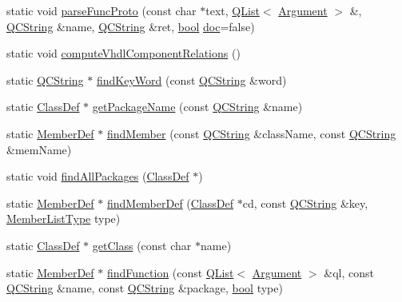 \begin{DoxyCompactItemize}
\item 
static void \hyperlink{class_vhdl_doc_gen_a42d423663159ccd360d8838005662343}{parse\+Func\+Proto} (const char $\ast$text, \hyperlink{class_q_list}{Q\+List}$<$ \hyperlink{struct_argument}{Argument} $>$ \&, \hyperlink{class_q_c_string}{Q\+C\+String} \&name, \hyperlink{class_q_c_string}{Q\+C\+String} \&ret, \hyperlink{qglobal_8h_a1062901a7428fdd9c7f180f5e01ea056}{bool} \hyperlink{vhdljjparser_8cpp_a9910424bf5401d657c3b3fdff6fcc152}{doc}=false)
\item 
static void \hyperlink{class_vhdl_doc_gen_ab8681769cd2f027fbf46a4836d3825e9}{compute\+Vhdl\+Component\+Relations} ()
\item 
static \hyperlink{class_q_c_string}{Q\+C\+String} $\ast$ \hyperlink{class_vhdl_doc_gen_a0338d8a473042e0ce824cd33def75544}{find\+Key\+Word} (const \hyperlink{class_q_c_string}{Q\+C\+String} \&word)
\item 
static \hyperlink{class_class_def}{Class\+Def} $\ast$ \hyperlink{class_vhdl_doc_gen_ad890048820909df255f6ee3f95d6ed80}{get\+Package\+Name} (const \hyperlink{class_q_c_string}{Q\+C\+String} \&name)
\item 
static \hyperlink{class_member_def}{Member\+Def} $\ast$ \hyperlink{class_vhdl_doc_gen_ac10fcedd625d329dc0013ee40e8546a7}{find\+Member} (const \hyperlink{class_q_c_string}{Q\+C\+String} \&class\+Name, const \hyperlink{class_q_c_string}{Q\+C\+String} \&mem\+Name)
\item 
static void \hyperlink{class_vhdl_doc_gen_a00216e37afbb1841a9631a80379b7f0a}{find\+All\+Packages} (\hyperlink{class_class_def}{Class\+Def} $\ast$)
\item 
static \hyperlink{class_member_def}{Member\+Def} $\ast$ \hyperlink{class_vhdl_doc_gen_a69d1010e9addd89076e51cb78ddf029f}{find\+Member\+Def} (\hyperlink{class_class_def}{Class\+Def} $\ast$cd, const \hyperlink{class_q_c_string}{Q\+C\+String} \&key, \hyperlink{types_8h_abe8ad5992f8938a28f918f51b199aa19}{Member\+List\+Type} type)
\item 
static \hyperlink{class_class_def}{Class\+Def} $\ast$ \hyperlink{class_vhdl_doc_gen_ac766b60a818a192ef5492bcee794a0ea}{get\+Class} (const char $\ast$name)
\item 
static \hyperlink{class_member_def}{Member\+Def} $\ast$ \hyperlink{class_vhdl_doc_gen_aded31b275385b372f3bb0d4182dd990e}{find\+Function} (const \hyperlink{class_q_list}{Q\+List}$<$ \hyperlink{struct_argument}{Argument} $>$ \&ql, const \hyperlink{class_q_c_string}{Q\+C\+String} \&name, const \hyperlink{class_q_c_string}{Q\+C\+String} \&package, \hyperlink{qglobal_8h_a1062901a7428fdd9c7f180f5e01ea056}{bool} type)

\end{DoxyCompactItemize}
